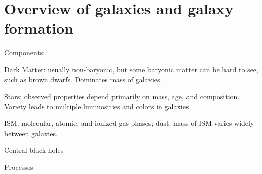 \documentclass[12pt]{article}
\begin{document}
\section{Overview of galaxies and galaxy formation}
Components:
  \begin{itemize*}
    \item Dark Matter: usually non-baryonic, but some baryonic matter
    can be hard to see, such as brown dwarfs. Dominates mass of
    galaxies.
    \item Stars: observed properties depend primarily on mass, age,
    and composition. Variety leads to multiple luminosities and colors
    in galaxies.
    \item ISM: molecular, atomic, and ionized gas phases; dust; mass
    of ISM varies widely between galaxies.
    \item Central black holes
  \end{itemize*}
Processes
\end{document}
